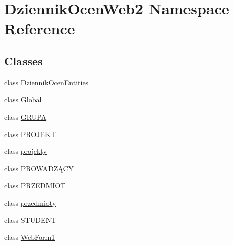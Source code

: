 \hypertarget{namespace_dziennik_ocen_web2}{}\section{Dziennik\+Ocen\+Web2 Namespace Reference}
\label{namespace_dziennik_ocen_web2}
\subsection*{Classes}
\begin{DoxyCompactItemize}
\item 
class \hyperlink{class_dziennik_ocen_web2_1_1_dziennik_ocen_entities}{Dziennik\+Ocen\+Entities}
\item 
class \hyperlink{class_dziennik_ocen_web2_1_1_global}{Global}
\item 
class \hyperlink{class_dziennik_ocen_web2_1_1_g_r_u_p_a}{G\+R\+U\+PA}
\item 
class \hyperlink{class_dziennik_ocen_web2_1_1_p_r_o_j_e_k_t}{P\+R\+O\+J\+E\+KT}
\item 
class \hyperlink{class_dziennik_ocen_web2_1_1projekty}{projekty}
\item 
class \hyperlink{class_dziennik_ocen_web2_1_1_p_r_o_w_a_d_z_xC4_x84_c_y}{P\+R\+O\+W\+A\+D\+ZĄ\+CY}
\item 
class \hyperlink{class_dziennik_ocen_web2_1_1_p_r_z_e_d_m_i_o_t}{P\+R\+Z\+E\+D\+M\+I\+OT}
\item 
class \hyperlink{class_dziennik_ocen_web2_1_1przedmioty}{przedmioty}
\item 
class \hyperlink{class_dziennik_ocen_web2_1_1_s_t_u_d_e_n_t}{S\+T\+U\+D\+E\+NT}
\item 
class \hyperlink{class_dziennik_ocen_web2_1_1_web_form1}{Web\+Form1}
\end{DoxyCompactItemize}
